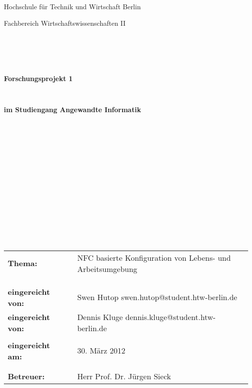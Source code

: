 \thispagestyle{empty}
\begin{center}
\Large{Hochschule für Technik und Wirtschaft Berlin}\\
\end{center}


\begin{center}
\Large{Fachbereich Wirtschaftswissenschaften II}
\end{center}
\begin{verbatim}





\end{verbatim}
\begin{center}
\textbf{\LARGE{Forschungsprojekt 1}}
\end{center}
\begin{verbatim}


\end{verbatim}
\begin{center}
\textbf{im Studiengang Angewandte Informatik}
\end{center}
\begin{verbatim}
















\end{verbatim}

\begin{flushleft}
\begin{tabular}{lll}
\textbf{Thema:} & & NFC basierte Konfiguration von Lebens- und Arbeitsumgebung\\
& & \\
& & \\
& & \\
\textbf{eingereicht von:} & & Swen Hutop  \flq{}swen.hutop@student.htw-berlin.de\frq{}\\
\textbf{eingereicht von:} & & Dennis Kluge  \flq{}dennis.kluge@student.htw-berlin.de\frq{}\\
& & \\
\textbf{eingereicht am:} & & 30. März 2012\\
& & \\
& & \\
\textbf{Betreuer:} & & Herr Prof. Dr. Jürgen Sieck \\
\end{tabular}
\end{flushleft}

